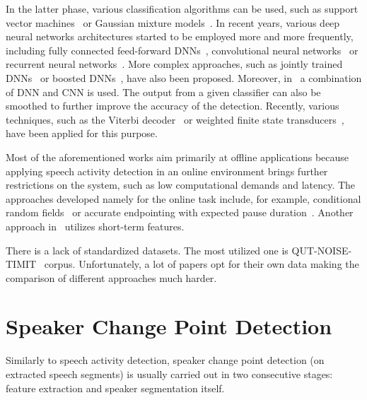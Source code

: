 \documentclass[FM,noheader,EN,bwtitles]{tulthesis}
\begin{document}
In the latter phase, various classification algorithms can be used, such as support vector machines~\parencite{DBLP:journals/csl/ShinCK10} or Gaussian mixture models~\parencite{DBLP:conf/interspeech/NgZNMZMVM12, DBLP:conf/interspeech/GhaemmaghamiDKS15}.
In recent years, various deep neural networks architectures started to be employed more and more frequently, including fully connected feed-forward DNNs~\parencite{DBLP:conf/interspeech/RyantLY13}, convolutional neural networks~\parencite{DBLP:conf/interspeech/SaonTSGK13} or recurrent neural networks~\parencite{DBLP:conf/icassp/HughesM13, DBLP:conf/icassp/EybenWSS13}.
More complex approaches, such as jointly trained DNNs~\parencite{DBLP:conf/interspeech/WangDBWDL15} or boosted DNNs~\parencite{DBLP:conf/interspeech/ZhangW14}, have also been proposed.
Moreover, in~\parencite{DBLP:conf/icassp/ThomasSSN15} a combination of DNN and CNN is used.
The output from a given classifier can also be smoothed to further improve the accuracy of the detection.
Recently, various techniques, such as the Viterbi decoder~\parencite{DBLP:conf/interspeech/RyantLY13, DBLP:conf/interspeech/GaoSKHKSN11} or weighted finite state transducers~\parencite{DBLP:conf/interspeech/ChungLL13}, have been applied for this purpose.

Most of the aforementioned works aim primarily at offline applications because applying speech activity detection in an online environment brings further restrictions on the system, such as low computational demands and latency.
The approaches developed namely for the online task include, for example, conditional random fields~\parencite{DBLP:conf/interspeech/GaoSKHKSN11} or accurate endpointing with expected pause duration~\parencite{DBLP:conf/interspeech/LiuHR15}.
Another approach in~\parencite{DBLP:conf/eusipco/MoattarH09} utilizes short-term features.

There is a lack of standardized datasets.
The most utilized one is QUT-NOISE-TIMIT~\parencite{DBLP:conf/interspeech/DeanSVM10} corpus.
Unfortunately, a lot of papers opt for their own data making the comparison of different approaches much harder.

\section{Speaker Change Point Detection}
\label{s:scpd}

Similarly to speech activity detection, speaker change point detection (on extracted speech segments) is usually carried out in two consecutive stages: feature extraction and speaker segmentation itself.
\end{document}
